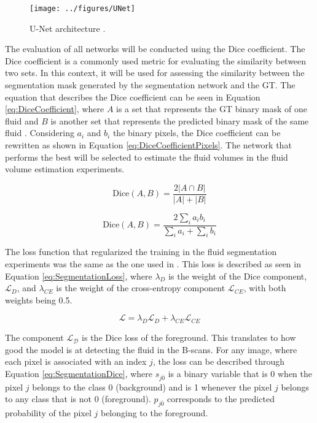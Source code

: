 \begin{figure}[!ht]
	\centering
	\texttt{[image: ../figures/UNet]}
	\caption{U-Net architecture \cite{Ronneberger2015}.}
	\label{fig:UNet}
\end{figure}

The evaluation of all networks will be conducted using the Dice coefficient. The Dice coefficient is a commonly used metric for evaluating the similarity between two sets. In this context, it will be used for assessing the similarity between the segmentation mask generated by the segmentation network and the GT. The equation that describes the Dice coefficient can be seen in Equation \ref{eq:DiceCoefficient}, where $A$ is a set that represents the GT binary mask of one fluid and $B$ is another set that represents the predicted binary mask of the same fluid \cite{Shamir2019}. Considering $a_{i}$ and $b_{i}$ the binary pixels, the Dice coefficient can be rewritten as shown in Equation \ref{eq:DiceCoefficientPixels}. The network that performs the best will be selected to estimate the fluid volumes in the fluid volume estimation experiments.

\begin{equation}
	\text{Dice}(A, B) = \frac{2|A \cap B|}{|A| + |B|}
	\label{eq:DiceCoefficient}
\end{equation}

\begin{equation}
	\text{Dice}(A, B) = \frac{2\sum_{i} a_{i} b_{i}}{\sum_{i} a_{i} + \sum_{i} b_{i}}
	\label{eq:DiceCoefficientPixels}
\end{equation}

The loss function that regularized the training in the fluid segmentation experiments was the same as the one used in \textcite{Tennakoon2018}. This loss is described as seen in Equation \ref{eq:SegmentationLoss}, where $\lambda_{D}$ is the weight of the Dice component, $\mathcal{L}_{D}$, and $\lambda_{CE}$ is the weight of the cross-entropy component $\mathcal{L}_{CE}$, with both weights being 0.5.

\begin{equation}
	\mathcal{L} = \lambda_{D} \mathcal{L}_{D} + \lambda_{CE} \mathcal{L}_{CE}
	\label{eq:SegmentationLoss}
\end{equation}

The component $\mathcal{L_{D}}$ is the Dice loss of the foreground. This translates to how good the model is at detecting the fluid in the B-scans. For any image, where each pixel is associated with an index $j$, the loss can be described through Equation \ref{eq:SegmentationDice}, where $s_{j\overline{0}}$ is a binary variable that is 0 when the pixel $j$ belongs to the class 0 (background) and is 1 whenever the pixel $j$ belongs to any class that is not 0 (foreground). $p_{j\overline{0}}$ corresponds to the predicted probability of the pixel $j$ belonging to the foreground.

